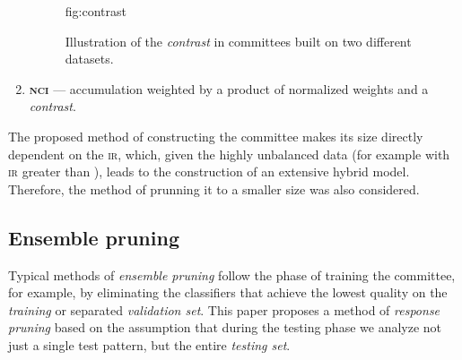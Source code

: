 \documentclass[pmlr]{jmlr}
\begin{document}
\begin{enumerate}
\begin{figure}[!h]
\floatconts
  {fig:contrast}
  {\caption{Illustration of the \emph{contrast} in committees built on two different datasets.}}
  {%
  }
\end{figure}

	
	\item \textbf{\textsc{nci}} --- accumulation weighted by a product of normalized weights and a \emph{contrast}.
\end{enumerate}

The proposed method of constructing the committee makes its size directly dependent on the \textsc{ir}, which, given the highly unbalanced data (for example with \textsc{ir} greater than ), leads to the construction of an extensive hybrid model. Therefore, the method of prunning it to a smaller size was also considered.

\subsection{Ensemble pruning}

Typical methods of \emph{ensemble pruning} follow the phase of training the committee, for example, by eliminating the classifiers that achieve the lowest quality on the \emph{training} or separated \emph{validation set}. This paper proposes a method of \emph{response pruning} based on the assumption that during the testing phase we analyze not just a single test pattern, but the entire \emph{testing set}.
\end{document}
